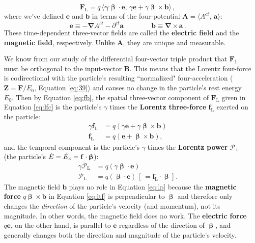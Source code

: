 \documentclass[12pt]{article}
\renewcommand{\vv}[1]{\mathbf{#1}}
\newcommand{\vvbeta}{\bm{\upbeta}}
\newcommand{\del}{\boldsymbol{\nabla}}
\begin{document}
\begin{equation}\label{eq:lfc}
\boxed{ \vv F_{\textrm{L}} = q \, \big \langle \vv \gamma \vvbeta \cdot \vv e , \, \gamma \vv e + \gamma \vvbeta \times \vv b \big \rangle } \, ,
\end{equation}
where we've defined $\vv e$ and $\vv b$ in terms of the four-potential $\vv A = \langle A^{ct}, \, \vv a \rangle$:
\begin{equation}\label{eq:eb}
\boxed{ \vv e \equiv - \del A^{ct} - \partial^{ct} \vv a \qquad \qquad \vv b \equiv \del \times \vv a } \, .
\end{equation}
These time-dependent three-vector fields are called the \textbf{electric field} and the \textbf{magnetic field}, respectively. Unlike $\vv A$, they are unique and measurable.

We know from our study of the differential four-vector triple product that $\vv F_{\mathrm{L}}$ must be orthogonal to the input-vector $\vv B$. This means that the Lorentz four-force is codirectional with the particle's resulting ``normalized" four-acceleration ($\vv Z =  \vv F / E_0$, Equation \ref{eq:39}) and causes no change in the particle's rest energy $E_0$. Then by Equation \ref{eq:fb}, the spatial three-vector component of $\vv F_{\textrm{L}}$ given in Equation \ref{eq:lfc} is the particle's $\gamma$ times the \textbf{Lorentz three-force} $\vv f_{\textrm{L}}$ exerted on the particle:
\begin{equation}\label{eq:ltf}
\begin{split}
\gamma \vv f_{\textrm{L}} &= q ( \gamma \vv e + \gamma \vvbeta \times \vv b ) \\
\vv f_{\textrm{L}} &= q ( \vv e + \vvbeta \times \vv b ),
\end{split}
\end{equation}
and the temporal component is the particle's $\gamma$ times the \textbf{Lorentz power} $\mathcal{P}_{\textrm{L}}$ (the particle's $\dot{E} = \dot{E}_{\mkern.5mu \textrm{k}} = \vv f \cdot \vvbeta$):
\begin{equation}\label{eq:lp}
\begin{split}
\gamma \mathcal{P}_{\textrm{L}} &= q ( \gamma \vvbeta \cdot \vv e ) \\
\mathcal{P}_{\textrm{L}} &= q ( \vvbeta \cdot \vv e ) \, \left[ \, = \vv f_{\textrm{L}} \cdot \vvbeta \right].
\end{split}
\end{equation}
The magnetic field $\vv b$ plays no role in Equation \ref{eq:lp} because the \textbf{magnetic force} $q \vvbeta \times \vv b$ in Equation \ref{eq:ltf} is perpendicular to $\vvbeta$ and therefore only changes the \emph{direction} of the particle's velocity (and momentum), not its magnitude. In other words, the magnetic field does no work. The \textbf{electric force} $q \vv e$, on the other hand, is parallel to $\vv e$ regardless of the direction of $\vvbeta$, and generally changes both the direction and magnitude of the particle's velocity.
\end{document}
